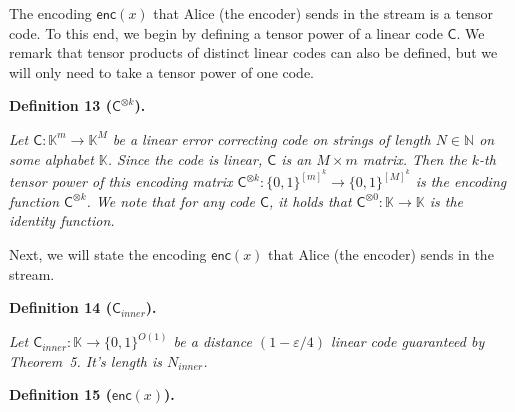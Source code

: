 \documentclass[10pt,a4paper]{article}
\begin{document}
The encoding $\mathsf{enc}(x)$ that Alice (the encoder) sends in the stream is a tensor code. To this end, we begin by defining a tensor power of a linear code $\mathsf{C}$. We remark that tensor products of distinct linear codes can also be defined, but we will only need to take a tensor power of one code.\par





\par\medskip\noindent\textbf{
\textbf{Definition 13}\textbf{ }($\mathsf{C}^{\otimes k}$)\textbf{.}
}\par



\emph{Let $\mathsf{C}:\mathbb{K}^{m}\to\mathbb{K}^{M}$ be a linear error correcting code on strings of length $N\in\mathbb{N}$ on some alphabet $\mathbb{K}$. Since the code is linear, $\mathsf{C}$ is an $M\times m$ matrix. Then the $k$-th tensor power of this encoding matrix $\mathsf{C}^{\otimes k}:\{0,1\}^{[m]^{k}}\to\{0,1\}^{[M]^{k}}$ is the encoding function $\mathsf{C}^{\otimes k}$. We note that for any code $\mathsf{C}$, it holds that $\mathsf{C}^{\otimes 0}:\mathbb{K}\to\mathbb{K}$ is the identity function.}\par






Next, we will state the encoding $\mathsf{enc}(x)$ that Alice (the encoder) sends in the stream.\par





\par\medskip\noindent\textbf{
\textbf{Definition 14}\textbf{ }($\mathsf{C}_{inner}$)\textbf{.}
}\par



\emph{Let $\mathsf{C}_{inner}:\mathbb{K}\to\{0,1\}^{O(1)}$ be a distance $(1-\varepsilon/4)$ linear code guaranteed by Theorem 5. It’s length is $N_{inner}$.}\par







\par\medskip\noindent\textbf{
\textbf{Definition 15}\textbf{ }($\mathsf{enc}(x)$)\textbf{.}
}\par
\end{document}
